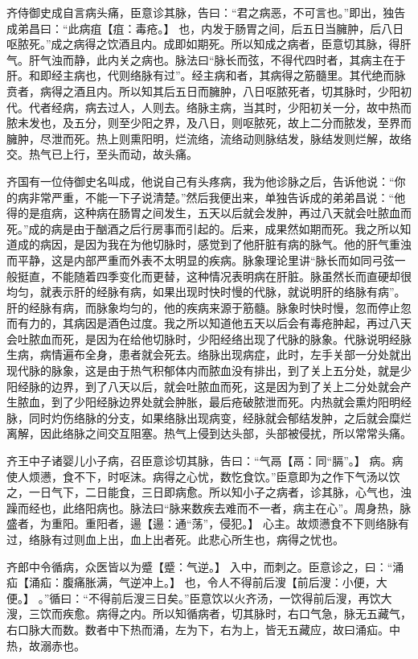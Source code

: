 \documentclass[12pt,UTF8]{ctexbook}
\begin{document}
齐侍御史成自言病头痛，臣意诊其脉，告曰：“君之病恶，不可言也。”即出，独告成弟昌曰：“此病疽【疽：毒疮。】 也，内发于肠胃之间，后五日当臃肿，后八日呕脓死。”成之病得之饮酒且内。成即如期死。所以知成之病者，臣意切其脉，得肝气。肝气浊而静，此内关之病也。脉法曰“脉长而弦，不得代四时者，其病主在于肝。和即经主病也，代则络脉有过”。经主病和者，其病得之筋髓里。其代绝而脉贲者，病得之酒且内。所以知其后五日而臃肿，八日呕脓死者，切其脉时，少阳初代。代者经病，病去过人，人则去。络脉主病，当其时，少阳初关一分，故中热而脓未发也，及五分，则至少阳之界，及八日，则呕脓死，故上二分而脓发，至界而臃肿，尽泄而死。热上则熏阳明，烂流络，流络动则脉结发，脉结发则烂解，故络交。热气已上行，至头而动，故头痛。

齐国有一位侍御史名叫成，他说自己有头疼病，我为他诊脉之后，告诉他说：“你的病非常严重，不能一下子说清楚。”然后我便出来，单独告诉成的弟弟昌说：“他得的是疽病，这种病在肠胃之间发生，五天以后就会发肿，再过八天就会吐脓血而死。”成的病是由于酗酒之后行房事而引起的。后来，成果然如期而死。我之所以知道成的病因，是因为我在为他切脉时，感觉到了他肝脏有病的脉气。他的肝气重浊而平静，这是内部严重而外表不太明显的疾病。脉象理论里讲“脉长而如同弓弦一般挺直，不能随着四季变化而更替，这种情况表明病在肝脏。脉虽然长而直硬却很均匀，就表示肝的经脉有病，如果出现时快时慢的代脉，就说明肝的络脉有病”。肝的经脉有病，而脉象均匀的，他的疾病来源于筋髓。脉象时快时慢，忽而停止忽而有力的，其病因是酒色过度。我之所以知道他五天以后会有毒疮肿起，再过八天会吐脓血而死，是因为在给他切脉时，少阳经络出现了代脉的脉象。代脉说明经脉生病，病情遍布全身，患者就会死去。络脉出现病症，此时，左手关部一分处就出现代脉的脉象，这是由于热气积郁体内而脓血没有排出，到了关上五分处，就是少阳经脉的边界，到了八天以后，就会吐脓血而死，这是因为到了关上二分处就会产生脓血，到了少阳经脉边界处就会肿胀，最后疮破脓泄而死。内热就会熏灼阳明经脉，同时灼伤络脉的分支，如果络脉出现病变，经脉就会郁结发肿，之后就会糜烂离解，因此络脉之间交互阻塞。热气上侵到达头部，头部被侵扰，所以常常头痛。

齐王中子诸婴儿小子病，召臣意诊切其脉，告曰：“气鬲【鬲：同“膈”。】 病。病使人烦懑，食不下，时呕沫。病得之心忧，数忔食饮。”臣意即为之作下气汤以饮之，一日气下，二日能食，三日即病愈。所以知小子之病者，诊其脉，心气也，浊躁而经也，此络阳病也。脉法曰“脉来数疾去难而不一者，病主在心”。周身热，脉盛者，为重阳。重阳者，逿【逿：通“荡”，侵犯。】 心主。故烦懑食不下则络脉有过，络脉有过则血上出，血上出者死。此悲心所生也，病得之忧也。

齐郎中令循病，众医皆以为蹙【蹙：气逆。】 入中，而刺之。臣意诊之，曰：“涌疝【涌疝：腹痛胀满，气逆冲上。】 也，令人不得前后溲【前后溲：小便，大便。】 。”循曰：“不得前后溲三日矣。”臣意饮以火齐汤，一饮得前后溲，再饮大溲，三饮而疾愈。病得之内。所以知循病者，切其脉时，右口气急，脉无五藏气，右口脉大而数。数者中下热而涌，左为下，右为上，皆无五藏应，故曰涌疝。中热，故溺赤也。
\end{document}

